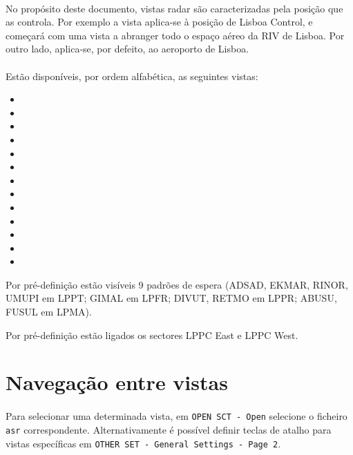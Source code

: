 \documentclass[10pt]{report}
\begin{document}
\paragraph*{} No propósito deste documento, vistas radar são caracterizadas pela posição que as
controla. Por exemplo a vista  aplica-se à posição de Lisboa Control, e começará com
uma vista a abranger todo o espaço aéreo da RIV de Lisboa. Por outro lado, 
aplica-se, por defeito, ao aeroporto de Lisboa.

\paragraph*{} Estão disponíveis, por ordem alfabética, as seguintes vistas:
\begin{itemize}
    \item {}
    \item {}
    \item {}
    \item {}
    \item {}
    \item {}
    \item {}
    \item {}
    \item {}
    \item {}
    \item {}
    \item {}
    \item {}
\end{itemize}

Por pré-definição estão visíveis 9 padrões de espera (ADSAD, EKMAR, RINOR, UMUPI em LPPT;
GIMAL em LPFR; DIVUT, RETMO em LPPR; ABUSU, FUSUL em LPMA).

Por pré-definição estão ligados os sectores LPPC East e LPPC West.

\section{Navegação entre vistas}

\paragraph*{} Para selecionar uma determinada vista, em \texttt{OPEN SCT - Open} selecione o ficheiro
\texttt{asr} correspondente. Alternativamente é possível definir teclas de atalho para vistas
específicas em \texttt{OTHER SET - General Settings - Page 2}.
\end{document}
